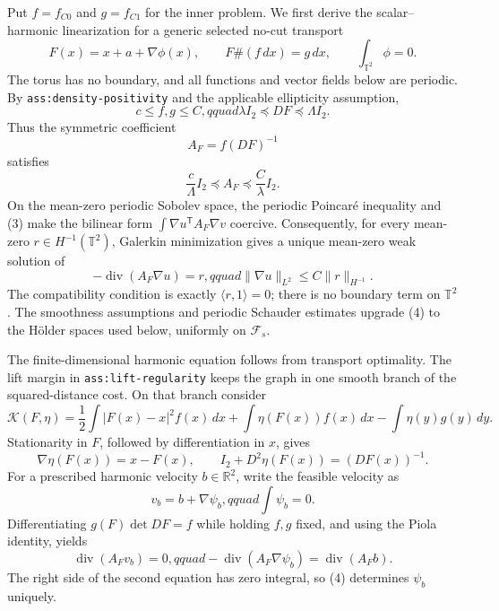 Put \(f=f_{C0}\) and \(g=f_{C1}\) for the inner problem.  We first derive the scalar--harmonic linearization for a generic selected no-cut transport
\[
 F(x)=x+a+\nabla\phi(x),\qquad F\#(f\,dx)=g\,dx,
 \qquad \int_{\mathbb T^2}\phi=0.                                      \tag{1}
\]
The torus has no boundary, and all functions and vector fields below are periodic.  By \texttt{ass:density-positivity} and the applicable ellipticity assumption,
\[
 c\leq f,g\leq C,qquad
 \lambda I_2\preceq DF\preceq\Lambda I_2.                              \tag{2}
\]
Thus the symmetric coefficient
\[
 A_F=f(DF)^{-1}
\]
satisfies
\[
 \frac{c}{\Lambda}I_2\preceq A_F\preceq\frac{C}{\lambda}I_2.           \tag{3}
\]
On the mean-zero periodic Sobolev space, the periodic Poincar\'e inequality and (3) make the bilinear form \(\int\nabla u^{\mathsf T}A_F\nabla v\) coercive.  Consequently, for every mean-zero \(r\in H^{-1}(\mathbb T^2)\), Galerkin minimization gives a unique mean-zero weak solution of
\[
 -\operatorname{div}(A_F\nabla u)=r,qquad
 \|\nabla u\|_{L^2}\leq C\|r\|_{H^{-1}}.                              \tag{4}
\]
The compatibility condition is exactly \(\langle r,1\rangle=0\); there is no boundary term on \(\mathbb T^2\).  The smoothness assumptions and periodic Schauder estimates upgrade (4) to the H\"older spaces used below, uniformly on \(\mathcal F_s\).

The finite-dimensional harmonic equation follows from transport optimality.  The lift margin in \texttt{ass:lift-regularity} keeps the graph in one smooth branch of the squared-distance cost.  On that branch consider
\[
 \mathcal K(F,\eta)=\frac12\int|F(x)-x|^2f(x)\,dx
 +\int\eta(F(x))f(x)\,dx-\int\eta(y)g(y)\,dy.                           \tag{5}
\]
Stationarity in \(F\), followed by differentiation in \(x\), gives
\[
 \nabla\eta(F(x))=x-F(x),\qquad
 I_2+D^2\eta(F(x))=(DF(x))^{-1}.                                       \tag{6}
\]
For a prescribed harmonic velocity \(b\in\mathbb R^2\), write the feasible velocity as
\[
 v_b=b+\nabla\psi_b,qquad \int\psi_b=0.                               \tag{7}
\]
Differentiating \(g(F)\det DF=f\) while holding \(f,g\) fixed, and using the Piola identity, yields
\[
 \operatorname{div}(A_Fv_b)=0,qquad
 -\operatorname{div}(A_F\nabla\psi_b)=\operatorname{div}(A_Fb).        \tag{8}
\]
The right side of the second equation has zero integral, so (4) determines \(\psi_b\) uniquely.

